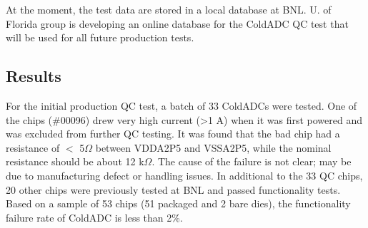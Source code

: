 At the moment, the test data are stored in a local database at BNL. U. of Florida group is developing an online database for the ColdADC QC test that will be used for all future production tests.

\subsection{Results}
\label{sec:6.2}
For the initial production QC test, a batch of 33 ColdADCs were tested. One of the chips (\#00096)  drew very high current (>1 A) when it 
was first powered and was excluded from further QC testing. It was found that the bad chip had a resistance of $<$ 5$\Omega$ between 
VDDA2P5 and VSSA2P5, while the nominal resistance should be about 12 k$\Omega$. The cause of the failure is not clear; may be due to 
manufacturing defect or handling issues. In additional to the 33 QC chips, 20 other chips were previously tested at BNL and passed 
functionality tests. Based on a sample of 53 chips (51 packaged and 2 bare dies), the functionality failure rate of ColdADC is less than 2\%.


